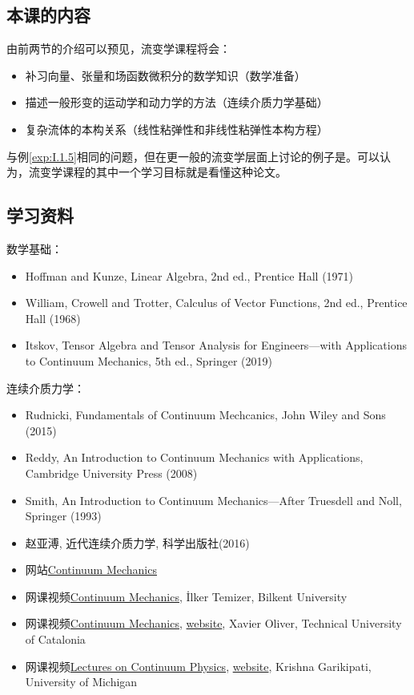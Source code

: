 \documentclass[main.tex]{subfiles}
\begin{document}
\subsection{本课的内容}
由前两节的介绍可以预见，流变学课程将会：
\begin{itemize}
    \item 补习向量、张量和场函数微积分的数学知识（数学准备）
    \item 描述一般形变的运动学和动力学的方法（连续介质力学基础）
    \item 复杂流体的本构关系（线性粘弹性和非线性粘弹性本构方程）
\end{itemize}
与例\ref{exp:I.1.5}相同的问题，但在更一般的流变学层面上讨论的例子是\citet{Zheng1991}。可以认为，流变学课程的其中一个学习目标就是看懂这种论文。
\subsection{学习资料}
数学基础：
\begin{itemize}
    \item Hoffman and Kunze, Linear Algebra, 2nd ed., Prentice Hall (1971)
    \item William, Crowell and Trotter, Calculus of Vector Functions, 2nd ed., Prentice Hall (1968)
    \item Itskov, Tensor Algebra and Tensor Analysis for Engineers---with Applications to Continuum Mechanics, 5th ed., Springer (2019)
\end{itemize}
连续介质力学：
\begin{itemize}
    \item Rudnicki, Fundamentals of Continuum Mechcanics, John Wiley and Sons (2015)
    \item Reddy, An Introduction to Continuum Mechanics with Applications, Cambridge University Press (2008)
    \item Smith, An Introduction to Continuum Mechanics---After Truesdell and Noll, Springer (1993)
    \item 赵亚溥, 近代连续介质力学, 科学出版社(2016)
    \item 网站\href{http://www.continuummechnaics.org}{Continuum Mechanics}
    \item 网课视频\href{https://www.youtube.com/playlist?list=PL5B3KLQNAC5j46Ro64xF7hLV6Uf-gHUHL}{Continuum Mechanics}, İlker Temizer, Bilkent University
    \item 网课视频\href{https://www.youtube.com/playlist?list=PLp-8j6_XqvKSV9eaOVZl95z6eeGqifFOz}{Continuum Mechanics}, \href{http://oliver.rmee.upc.edu/xo/vpage/1/0/Teaching/Continuum-Mechanics}{website}, Xavier Oliver, Technical University of Catalonia
    \item 网课视频\href{https://www.youtube.com/playlist?list=PLJhG_d-Sp_JHvh47eZ8fSuUCUdp86i__y}{Lectures on Continuum Physics}, \href{https://open.umich.edu/find/open-educational-resources/engineering/lectures-continuum-physics}{website}, Krishna Garikipati, University of Michigan
\end{itemize}
\end{document}
